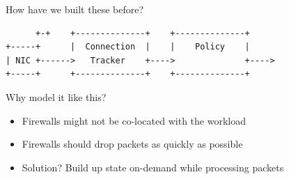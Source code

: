 \documentclass[black,white]{beamer}
\begin{document}

    \begin{frame}[fragile]{How have we built these before?}
        \centering
        \vfill
        \begin{verbatim}
      +-+    +--------------+    +--------------+
+-----+      |  Connection  |    |    Policy    |
| NIC +------>   Tracker    +---->              +---->
+-----+      +--------------+    +--------------+
        \end{verbatim}
        \vfill
    \end{frame}

    \begin{frame}{Why model it like this?}
        \begin{itemize}
             \item Firewalls might not be co-located with the workload \bigskip
             \item Firewalls should drop packets as quickly as possible \bigskip
             \item Solution? Build up state on-demand while processing packets \bigskip
        \end{itemize}
    \end{frame}
\end{document}
